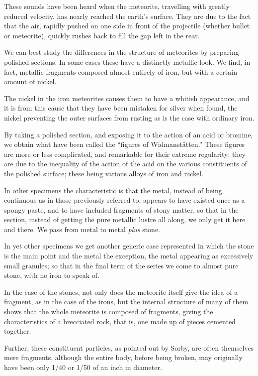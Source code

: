 \documentclass[a4paper, 12pt, oneside, polutonikogreek, english]{article}
\begin{document}
These sounds have been heard when the meteorite, travelling with greatly reduced velocity, has nearly reached the earth's surface. They are due to the fact that the air, rapidly pushed on one side in front of the projectile (whether bullet or meteorite), quickly rushes back to fill the gap left in the rear.

We can best study the differences in the structure of meteorites by preparing polished sections. In some cases these have a distinctly metallic look. We find, in fact, metallic fragments composed almost entirely of iron, but with a certain amount of nickel.

The nickel in the iron meteorites causes them to have a whitish appearance, and it is from this cause that they have been mistaken for silver when found, the nickel preventing the outer surfaces from rusting as is the case with ordinary iron.

By taking a polished section, and exposing it to the action of an acid or bromine, we obtain what have been called the ``figures of Widmanstätten.'' These figures are more or less complicated, and remarkable for their extreme regularity; they are due to the inequality of the action of the acid on the various constituents of the polished surface; these being various alloys of iron and nickel.

In other specimens the characteristic is that the metal, instead of being continuous as in those previously referred to, appears to have existed once as a spongy paste, and to have included fragments of stony matter, so that in the section, instead of getting the pure metallic lustre all along, we only get it here and there. We pass from metal to metal \emph{plus} stone.

In yet other specimens we get another generic case represented in which the stone is the main point and the metal the exception, the metal appearing as excessively small granules; so that in the final term of the series we come to almost pure stone, with no iron to speak of.

In the case of the stones, not only does the meteorite itself give the idea of a fragment, as in the case of the irons, but the internal structure of many of them shows that the whole meteorite is composed of fragments, giving the characteristics of a brecciated rock, that is, one made up of pieces cemented together.

Further, these constituent particles, as pointed out by Sorby, are often themselves mere fragments, although the entire body, before being broken, may originally have been only 1/40 or 1/50 of an inch in diameter.
\end{document}

